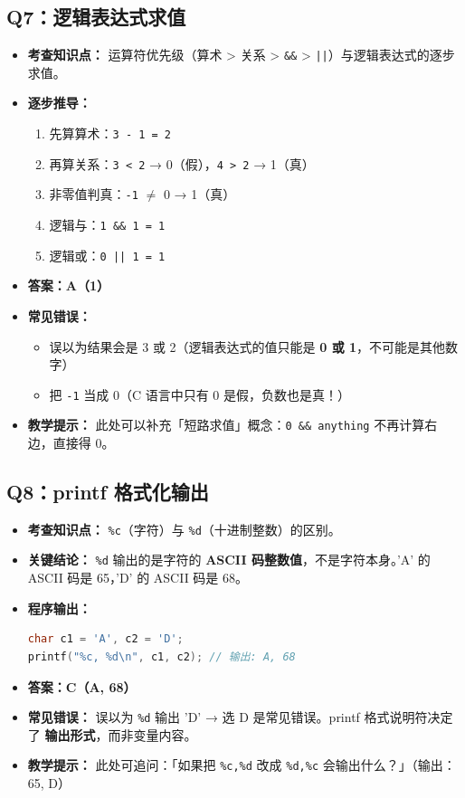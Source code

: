 \subsection{Q7：逻辑表达式求值}

\begin{itemize}
    \item \textbf{考查知识点：} 运算符优先级（算术 > 关系 > \texttt{\&\&} > \texttt{||}）与逻辑表达式的逐步求值。
    \item \textbf{逐步推导：}
    \begin{enumerate}
        \item 先算算术：\texttt{3 - 1 = 2}
        \item 再算关系：\texttt{3 < 2} → 0（假），\texttt{4 > 2} → 1（真）
        \item 非零值判真：\texttt{-1} $\neq$ 0 → 1（真）
        \item 逻辑与：\texttt{1 \&\& 1 = 1}
        \item 逻辑或：\texttt{0 || 1 = 1}
    \end{enumerate}
    \item {\color{highlight}\textbf{答案：A（1）}}
    \item \textbf{常见错误：}
    \begin{itemize}
        \item 误以为结果会是 3 或 2（逻辑表达式的值只能是 \textbf{0 或 1}，不可能是其他数字）
        \item 把 \texttt{-1} 当成 0（C 语言中只有 0 是假，负数也是真！）
    \end{itemize}
    \item \textbf{教学提示：} 此处可以补充「短路求值」概念：\texttt{0 \&\& anything} 不再计算右边，直接得 0。
\end{itemize}

\subsection{Q8：printf 格式化输出}

\begin{itemize}
    \item \textbf{考查知识点：} \texttt{\%c}（字符）与 \texttt{\%d}（十进制整数）的区别。
    \item \textbf{关键结论：} \texttt{\%d} 输出的是字符的 \textbf{ASCII 码整数值}，不是字符本身。'A' 的 ASCII 码是 65，'D' 的 ASCII 码是 68。
    \item \textbf{程序输出：}
\begin{lstlisting}[language=C]
char c1 = 'A', c2 = 'D';
printf("%c, %d\n", c1, c2); // 输出: A, 68
\end{lstlisting}
    \item {\color{highlight}\textbf{答案：C（A, 68）}}
    \item \textbf{常见错误：} 误以为 \texttt{\%d} 输出 'D' → 选 D 是常见错误。printf 格式说明符决定了 \textbf{输出形式}，而非变量内容。
    \item \textbf{教学提示：} 此处可追问：「如果把 \texttt{\%c,\%d} 改成 \texttt{\%d,\%c} 会输出什么？」（输出：65, D）
\end{itemize}

